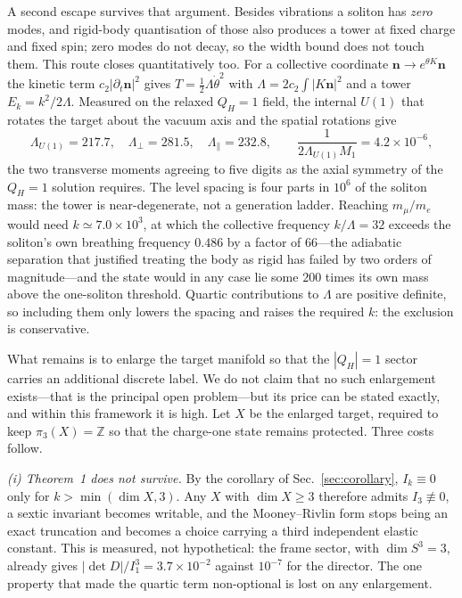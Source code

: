 \documentclass[aps,prd,preprint,nofootinbib,longbibliography]{revtex4-2}
\newcommand{\nv}{\bm{n}}
\newcommand{\Qh}{Q_H}
\begin{document}
A second escape survives that argument. Besides vibrations a soliton has
\emph{zero} modes, and rigid-body quantisation of those also produces a tower at
fixed charge and fixed spin; zero modes do not decay, so the width bound does not
touch them. This route closes quantitatively too. For a collective coordinate
$\nv\to e^{\theta K}\nv$ the kinetic term $c_2|\partial_t\nv|^2$ gives
$T=\tfrac12\Lambda\dot\theta^2$ with $\Lambda=2c_2\!\int\!|K\nv|^2$ and a tower
$E_k=k^2/2\Lambda$. Measured on the relaxed $\Qh=1$ field, the internal $U(1)$
that rotates the target about the vacuum axis and the spatial rotations give
\begin{equation}
\Lambda_{U(1)}=217.7,\quad \Lambda_{\perp}=281.5,\quad \Lambda_{\parallel}=232.8,
\qquad \frac{1}{2\Lambda_{U(1)}M_1}=4.2\times10^{-6},
\label{eq:collective}
\end{equation}
the two transverse moments agreeing to five digits as the axial symmetry of the
$\Qh=1$ solution requires. The level spacing is four parts in $10^{6}$ of the
soliton mass: the tower is near-degenerate, not a generation ladder. Reaching
$m_\mu/m_e$ would need $k\simeq7.0\times10^{3}$, at which the collective
frequency $k/\Lambda=32$ exceeds the soliton's own breathing frequency $0.486$
by a factor of $66$---the adiabatic separation that justified treating the body
as rigid has failed by two orders of magnitude---and the state would in any case
lie some $200$ times its own mass above the one-soliton threshold. Quartic
contributions to $\Lambda$ are positive definite, so including them only lowers
the spacing and raises the required $k$: the exclusion is conservative.

What remains is to enlarge the target manifold so that the $|\Qh|=1$ sector
carries an additional discrete label. We do not claim that no such enlargement
exists---that is the principal open problem---but its price can be stated
exactly, and within this framework it is high. Let $X$ be the enlarged target,
required to keep $\pi_3(X)=\mathbb{Z}$ so that the charge-one state remains
protected. Three costs follow.

\emph{(i) Theorem~1 does not survive.} By the corollary of
Sec.~\ref{sec:corollary}, $I_k\equiv0$ only for $k>\min(\dim X,3)$. Any $X$ with
$\dim X\ge3$ therefore admits $I_3\not\equiv0$, a sextic invariant becomes
writable, and the Mooney--Rivlin form stops being an exact truncation and becomes
a choice carrying a third independent elastic constant. This is measured, not
hypothetical: the frame sector, with $\dim S^3=3$, already gives
$|\det D|/I_1^3=3.7\times10^{-2}$ against $10^{-7}$ for the director. The one
property that made the quartic term non-optional is lost on any enlargement.
\end{document}
